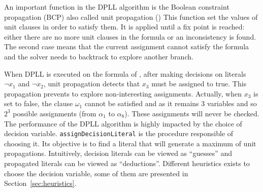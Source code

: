 \clearpage



An important function in the DPLL algorithm is the Boolean constraint propagation (BCP) also called unit propagation 
()
This function set the values of unit clauses in order to satisfy them. It is applied until a fix point is reached: 
either there are no more unit clauses in the formula or an inconsistency is found.
The second case means that the current assignment cannot satisfy the formula and the
solver needs to backtrack to explore another branch.



When DPLL is executed on the formula of , after making decisions on literals
$\neg x_1$ and $\neg x_2$, unit propagation detects that $x_3$ must be assigned to true.
This propagation prevents to explore non-interesting assignments. Actually, when $x_3$ is set to false,
the clause $\omega_1$ cannot be satisfied and as it remains 3 variables and so $2^3$ possible assignments
(from $\alpha_1$ to $\alpha_8$). These assignments will never be checked.
The performance of the DPLL algorithm is highly impacted by the choice of decision variable.
\texttt{assignDecisionLiteral} is the procedure responsible of choosing it.
Its objective is to find a literal that will generate a maximum of unit propagations.
Intuitively, decision literals can be viewed as “guesses” and propagated literals can be viewed as “deductions”. 
Different heuristics exists to choose the decision variable, some of them are presented in Section~\ref{sec:heuristics}.


%
%
